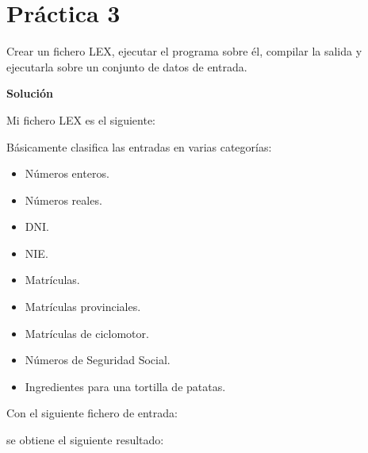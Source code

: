 \documentclass[12pt,spanish]{article}
\newenvironment{solution}{
	\par
	\textbf{Solución}
	\par

}
{
}
\begin{document}
\newpage
\section{Práctica 3}
Crear un fichero LEX, ejecutar el programa sobre él, compilar la salida y ejecutarla sobre un conjunto de datos de entrada.

\begin{solution}
	Mi fichero LEX es el siguiente:
	
	Básicamente clasifica las entradas en varias categorías:
	\begin{itemize}
		\item Números enteros.
		\item Números reales.
		\item DNI.
		\item NIE.
		\item Matrículas.
		\item Matrículas provinciales.
		\item Matrículas de ciclomotor.
		\item Números de Seguridad Social.
		\item Ingredientes para una tortilla de patatas.
	\end{itemize}
	Con el siguiente fichero de entrada:
	
	se obtiene el siguiente resultado:
	
\end{solution}
\end{document}
